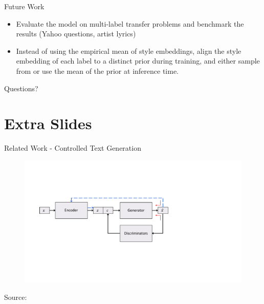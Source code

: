 \documentclass[aspectratio=169]{beamer}
\newcommand{\imgsrc}[1]{\tiny{Source: #1}}
\begin{document}
% 

\begin{frame}{Future Work}
	\begin{itemize}
		\item Evaluate the model on multi-label transfer problems and benchmark the results (Yahoo questions, artist lyrics)
		\item Instead of using the empirical mean of style embeddings, align the style embedding of each label to a distinct prior during training, and either sample from or use the mean of the prior at inference time.
	\end{itemize}
\end{frame}

% 

\begin{frame}[allowframebreaks]
	
	
\end{frame}

% 

\begin{frame}
	\centering
	\Huge{Questions?}
\end{frame}

% 

\section{Extra Slides}

\begin{frame}{Related Work - Controlled Text Generation}
	\centering
	\begin{figure}[ht]
		\includegraphics[width=\textwidth]{images/tcg-architecture}
	\end{figure}
	\imgsrc{\citet{hu2017toward}}
\end{frame}
\end{document}
